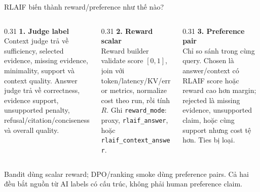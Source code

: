 \documentclass[aspectratio=169,10pt]{beamer}
\newcommand{\smallcode}[1]{\texttt{\scriptsize #1}}
\newcommand{\minihead}[1]{{\bfseries\color{AccentDark}#1}}
\newcommand{\takeaway}[1]{%
  \vspace{0.46em}
  \noindent\colorbox{Soft}{%
    \parbox{\dimexpr\linewidth-2\fboxsep}{\color{Ink}\strut #1\strut}%
  }%
}
\begin{document}
\begin{frame}{RLAIF biến thành reward/preference như thế nào?}
  \scriptsize
  \begin{center}
  \end{center}

  \vspace{0.18cm}
  \begin{columns}[T,onlytextwidth]
    \begin{column}{0.31\textwidth}
      \minihead{1. Judge label}\\
      \color{Muted}Context judge trả về sufficiency, selected evidence, missing evidence, minimality, support và context quality. Answer judge trả về correctness, evidence support, unsupported penalty, refusal/citation/conciseness và overall quality.
    \end{column}
    \begin{column}{0.31\textwidth}
      \minihead{2. Reward scalar}\\
      \color{Muted}Reward builder validate score \([0,1]\), join với token/latency/KV/error metrics, normalize cost theo run, rồi tính \(R\). Ghi \smallcode{reward\_mode}: proxy, \smallcode{rlaif\_answer}, hoặc \smallcode{rlaif\_context\_answer}.
    \end{column}
    \begin{column}{0.31\textwidth}
      \minihead{3. Preference pair}\\
      \color{Muted}Chỉ so sánh trong cùng query. Chosen là answer/context có RLAIF score hoặc reward cao hơn margin; rejected là missing evidence, unsupported claim, hoặc cùng support nhưng cost tệ hơn. Ties bị loại.
    \end{column}
  \end{columns}
  \takeaway{\scriptsize Bandit dùng scalar reward; DPO/ranking smoke dùng preference pairs. Cả hai đều bắt nguồn từ AI labels có cấu trúc, không phải human preference claim.}
\end{frame}
\end{document}
